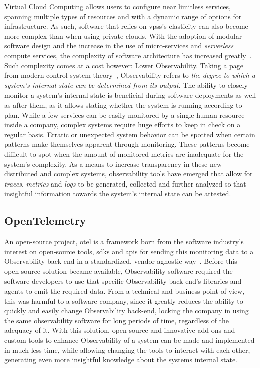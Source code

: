 Virtual Cloud Computing allows users to configure near limitless services, spanning multiple types of resources and with a dynamic range of options for infrastructure. As such, software that relies on \glspl{vps}'s elasticity can also become more complex than when using private clouds. With the adoption of modular software design and the increase in the use of micro-services and \textit{serverless} compute services, the complexity of software architecture has increased greatly~\Parencite{niedermaier_koetter_freymann_wagner_2019}.
Such complexity comes at a cost however: Lower Observability. Taking a page from modern control system theory~\Parencite{gopal1993modern}, Observability refers to \textit{the degree to which a system's internal state can be determined from its output}. 
The ability to closely monitor a system's internal state is beneficial during software deployments as well as after them, as it allows stating whether the system is running according to plan.
While a few services can be easily monitored by a single human resource inside a company, complex systems require huge efforts to keep in check on a regular basis. 
Erratic or unexpected system behavior can be spotted when certain patterns make themselves apparent through monitoring. These patterns become difficult to spot when the amount of monitored metrics are inadequate for the system's complexity.
As a means to increase transparency in these new distributed and complex systems, observability tools have emerged that allow for \textit{traces}, \textit{metrics} and \textit{logs} to be generated, collected and further analyzed so that insightful information towards the system's internal state can be attested.

\subsection{OpenTelemetry}\label{state-of-the-art:ss:opentelemetry}

An open-source project, \gls{otel} is a framework born from the software industry's interest on open-source tools, \glspl{sdk} and \glspl{api} for sending this monitoring data to a Observability back-end in a standardized, vendor-agnostic way~\Parencite{observability_primer_2022}. Before this open-source solution became available, Observability software required the software developers to use that specific Observability back-end's libraries and agents to emit the required data. From a technical and business point-of-view, this was harmful to a software company, since it greatly reduces the ability to quickly and easily change Observability back-end, locking the company in using the same observability software for long periods of time, regardless of the adequacy of it.
With this solution, open-source and innovative add-ons and custom tools to enhance Observability of a system can be made and implemented in much less time, while allowing changing the tools to interact with each other, generating even more insightful knowledge about the systems internal state.

